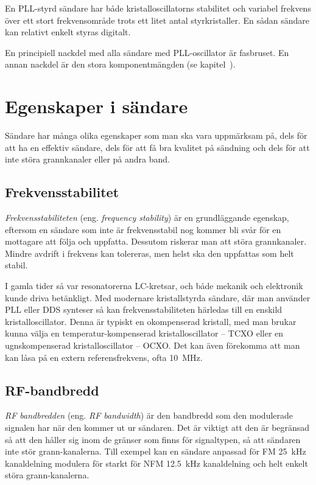 En PLL-styrd sändare har både kristalloscillatorns stabilitet och variabel
frekvens över ett stort frekvensområde trots ett litet antal styrkristaller.
En sådan sändare kan relativt enkelt styras digitalt.

En principiell nackdel med alla sändare med PLL-oscillator är fasbruset.
En annan nackdel är den stora komponentmängden
(se kapitel~).

\section{Egenskaper i sändare}

Sändare har många olika egenskaper som man ska vara uppmärksam på, dels för
att ha en effektiv sändare, dels för att få bra kvalitet på sändning och dels
för att inte störa grannkanaler eller på andra band.

\subsection{Frekvensstabilitet}

\emph{Frekvensstabiliteten} (eng. \emph{frequency stability}) är en
grundläggande egenskap, eftersom en sändare som inte är frekvensstabil nog
kommer bli svår för en mottagare att följa och uppfatta.
Dessutom riskerar man att störa grannkanaler.
Mindre avdrift i frekvens kan tolereras, men helst ska den uppfattas som
helt stabil.

I gamla tider så var resonatorerna LC-kretsar, och både mekanik och elektronik
kunde driva betänkligt.
Med modernare kristallstyrda sändare, där man använder PLL eller DDS synteser så
kan frekvensstabiliteten härledas till en enskild kristalloscillator.
Denna är typiskt en okompenserad kristall, med man brukar kunna välja en
temperatur-kompenserad kristalloscillator -- TCXO eller en ugnskompenserad
kristalloscillator -- OCXO.
Det kan även förekomma att man kan låsa på en extern referensfrekvens,
ofta \qty{10}{\mega\hertz}.

\subsection{RF-bandbredd}

\emph{RF bandbredden} (eng. \emph{RF bandwidth}) är den bandbredd som den
modulerade signalen har när den kommer ut ur sändaren.
Det är viktigt att den är begränsad så att den håller sig inom de gränser
som finns för signaltypen, så att sändaren inte stör grann-kanalerna.
Till exempel kan en sändare anpassad för FM \qty{25}{\kilo\hertz} kanaldelning
modulera för starkt för NFM \qty{12,5}{\kilo\hertz} kanaldelning och helt enkelt
störa grann-kanalerna.

